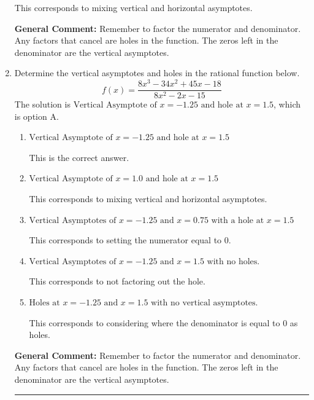 \documentclass{extbook}[14pt]
\newcommand{\litem}[1]{\item #1

\rule{\textwidth}{0.4pt}}
\begin{document}
\begin{enumerate}
{\begin{enumerate}[label=\Alph*.]
This corresponds to mixing vertical and horizontal asymptotes.
\end{enumerate}

\textbf{General Comment:} Remember to factor the numerator and denominator. Any factors that cancel are holes in the function. The zeros left in the denominator are the vertical asymptotes.
}
\litem{
Determine the vertical asymptotes and holes in the rational function below.
\[ f(x) = \frac{8x^{3} -34 x^{2} +45 x -18}{8x^{2} -2 x -15} \]The solution is \( \text{Vertical Asymptote of } x = -1.25 \text{ and hole at } x = 1.5 \), which is option A.\begin{enumerate}[label=\Alph*.]
\item \( \text{Vertical Asymptote of } x = -1.25 \text{ and hole at } x = 1.5 \)

This is the correct answer.
\item \( \text{Vertical Asymptote of } x = 1.0 \text{ and hole at } x = 1.5 \)

This corresponds to mixing vertical and horizontal asymptotes.
\item \( \text{Vertical Asymptotes of } x = -1.25 \text{ and } x = 0.75 \text{ with a hole at } x = 1.5 \)

This corresponds to setting the numerator equal to 0.
\item \( \text{Vertical Asymptotes of } x = -1.25 \text{ and } x = 1.5 \text{ with no holes.} \)

This corresponds to not factoring out the hole.
\item \( \text{Holes at } x = -1.25 \text{ and } x = 1.5 \text{ with no vertical asymptotes.} \)

This corresponds to considering where the denominator is equal to 0 as holes.
\end{enumerate}

\textbf{General Comment:} Remember to factor the numerator and denominator. Any factors that cancel are holes in the function. The zeros left in the denominator are the vertical asymptotes.
}
\end{enumerate}
\end{document}
